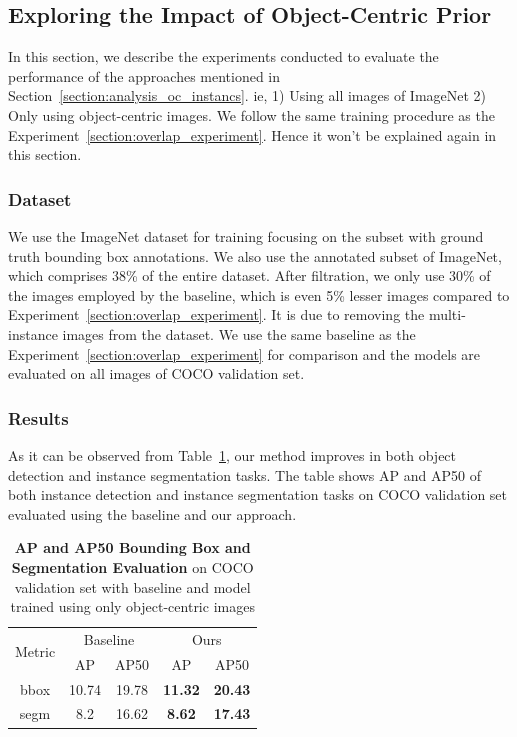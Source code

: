 \subsection{Exploring the Impact of Object-Centric Prior}
\label{section:obj_centic_prior_exp}
In this section, we describe the experiments conducted to evaluate the performance of the approaches mentioned in Section~\ref{section:analysis_oc_instancs}. ie, 1) Using all images of ImageNet 2) Only using object-centric images. We follow the same training procedure as the Experiment~\ref{section:overlap_experiment}. Hence it won't be explained again in this section.

\subsubsection{Dataset}
We use the ImageNet dataset for training focusing on the subset with ground truth bounding box annotations. We  also use the annotated subset of ImageNet, which comprises 38\% of the entire dataset. After filtration, we only use 30\% of the images employed by the baseline, which is even 5\% lesser images compared to Experiment~\ref{section:overlap_experiment}. It is due to removing the multi-instance images from the dataset. We use the same baseline as the Experiment~\ref{section:overlap_experiment} for comparison and the models are evaluated on all images of COCO validation set.

\subsubsection{Results}
As it can be observed from Table~\ref{tab:object-centric-analysis}, our method improves in both object detection and instance segmentation tasks. The table shows AP and AP50 of both instance detection and instance segmentation tasks on COCO validation set evaluated using the baseline and our approach.
\begin{table}[htbp]
	\centering
	\begin{tabular}{c|cc|cc}
		\toprule
		\multirow{2}{*}{Metric} & \multicolumn{2}{c|}{Baseline} & \multicolumn{2}{c}{Ours} \\ \cmidrule{2-5}
		& AP & AP50 & AP & AP50 \\ \midrule
		bbox & 10.74 & 19.78 & \textbf{11.32} & \textbf{20.43} \\
		\midrule
		segm & 8.2 & 16.62 & \textbf{8.62} & \textbf{17.43} \\
		\bottomrule
	\end{tabular}
	\caption[\textbf{Evaluation of Baseline vs Model Trained With Only Object-Centric Images}]{\textbf{AP and AP50 Bounding Box and Segmentation Evaluation} on COCO validation set with baseline and model trained using only object-centric images}
	\label{tab:object-centric-analysis}
\end{table}

